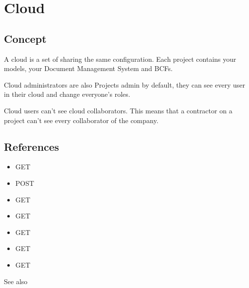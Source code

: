 \documentclass[a4paper,12pt,english]{sphinxmanual}
\begin{document}
\chapter{Cloud}
\label{\detokenize{cloud:cloud}}\label{\detokenize{cloud::doc}}

\section{Concept}
\label{\detokenize{cloud:concept}}
A cloud is a set of {\hyperref[\detokenize{projects::doc}]{}} sharing the same configuration.
Each project contains your models, your Document Management System and BCFs.

Cloud administrators are also Projects admin by default, they can see every user in their cloud and change everyone’s roles.

Cloud users can’t see cloud collaborators. This means that a contractor on a project can’t see every collaborator of the company.


\section{References}
\label{\detokenize{cloud:references}}\begin{itemize}
\item {} 
GET 

\item {} 
POST 

\item {} 
GET 

\item {} 
GET 

\item {} 
GET 

\item {} 
GET 

\item {} 
GET 

\end{itemize}




See also 
\end{document}
